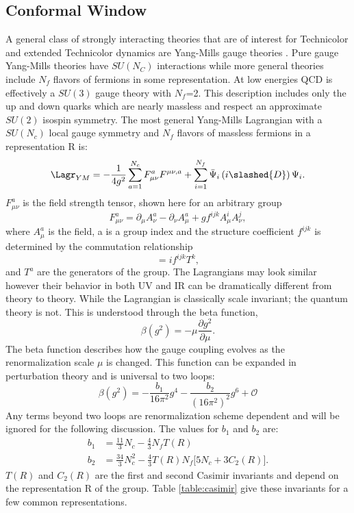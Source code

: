 \subsection{Conformal Window}
\label{sec:sec:conformalwindow}
A general class of strongly interacting theories that are of interest for Technicolor and extended Technicolor dynamics are Yang-Mills gauge theories \cite{DeGrand:2010ba,DeGrand:2009mt}.
Pure gauge Yang-Mills theories have $SU(N_C)$ interactions while more general theories include $N_f$ flavors of fermions in some representation.
At low energies QCD is effectively a $SU(3)$ gauge theory with $N_f$=2.
This description includes only the up and down quarks which are nearly massless and respect an approximate $SU(2)$ isospin symmetry.
The most general Yang-Mills Lagrangian with a $SU(N_c)$ local gauge symmetry and $N_f$ flavors of massless fermions in a representation R is:
\begin{equation}
  \Lagr_{YM}=-\frac{1}{4g^2}\sum\limits_{a=1}^{N_c} F^a_{\mu\nu}F^{\mu\nu,a}+\sum\limits_{i=1}^{N_f} \bar\Psi_i\left(i\slashed{D}\right)\Psi_i.  
\end{equation}
$F^a_{\mu\nu}$ is the field strength tensor, shown here for an arbitrary group
\begin{equation}
  F^a_{\mu\nu}=\partial_\mu A^a_\nu-\partial_\nu A^a_\mu + gf^{ijk}A^i_\mu A^j_\nu,
\end{equation}
where $A^a_\mu$ is the field, a is a group index and the structure coefficient $f^{ijk}$ is determined by the commutation relationship
\begin{equation}
  [T^i,T^j]=if^{ijk}T^k,
\end{equation}
and $T^a$ are the generators of the group.
The Lagrangians may look similar however their behavior in both UV and IR can be dramatically different from theory to theory.
While the Lagrangian is classically scale invariant; the quantum theory is not.
This is understood through the beta function,
\begin{equation}
  \beta (g^2)=-\mu\frac{\partial g^2}{\partial \mu}.
\end{equation}
The beta function describes how the gauge coupling evolves as the renormalization scale $\mu$ is changed.
This function can be expanded in perturbation theory and is universal to two loops:
\begin{equation}
  \beta\left(g^2\right)=-\frac{b_1}{16\pi^2}g^4-\frac{b_2}{(16\pi^2)^2}g^6+\mathcal{O}
\end{equation}
Any terms beyond two loops are renormalization scheme dependent and will be ignored for the following discussion.
The values for $b_1$ and $b_2$ are:
\begin{equation}
  \label{eqn:b1b2}
  \begin{aligned}
    b_1&=\frac{11}{3}N_c-\frac{4}{3}N_fT(R)\\
    b_2&=\frac{34}{3}N_c^2-\frac{4}{3}T(R)N_f\Big[5N_c+3C_2(R)\Big].
  \end{aligned}
\end{equation}
$T(R)$ and $C_2(R)$ are the first and second Casimir invariants and depend on the representation R of the group.
Table \ref{table:casimir} give these invariants for a few common representations.

